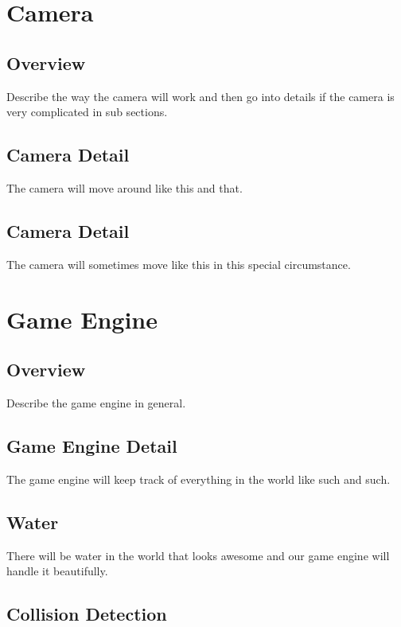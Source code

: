 \documentclass[a4paper]{report}
\begin{document}
	\section{Camera}

		\subsection{Overview}

			Describe the way the camera will work and then go into details if the camera is very complicated in sub sections.

		\subsection{Camera Detail}

			The camera will move around like this and that.

		\subsection{Camera Detail}

			The camera will sometimes move like this in this special circumstance.

	\section{Game Engine}

		\subsection{Overview}

			Describe the game engine in general.

		\subsection{Game Engine Detail}

			The game engine will keep track of everything in the world like such and such.

		\subsection{Water}

			There will be water in the world that looks awesome and our game engine will handle it beautifully.

		\subsection{Collision Detection}
\end{document}
